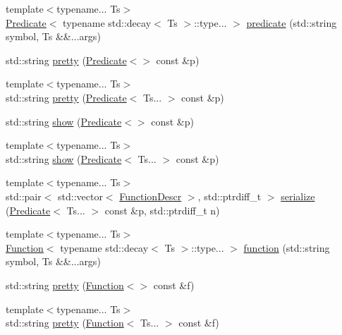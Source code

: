 \begin{DoxyCompactItemize}
\item 
{\footnotesize template$<$typename... Ts$>$ }\\\hyperlink{structpfq_1_1lang_1_1Predicate}{Predicate}$<$ typename std\+::decay$<$ Ts $>$\+::type... $>$ \hyperlink{namespacepfq_1_1lang_aca9adafc436b7f851621b979fa1aaf88}{predicate} (std\+::string symbol, Ts \&\&...args)
\item 
std\+::string \hyperlink{namespacepfq_1_1lang_a5bd21fba49ed1266540c831a9110fec6}{pretty} (\hyperlink{structpfq_1_1lang_1_1Predicate}{Predicate}$<$$>$ const \&p)
\item 
{\footnotesize template$<$typename... Ts$>$ }\\std\+::string \hyperlink{namespacepfq_1_1lang_a365497365bebd1ef44492e8027a6b3c0}{pretty} (\hyperlink{structpfq_1_1lang_1_1Predicate}{Predicate}$<$ Ts... $>$ const \&p)
\item 
std\+::string \hyperlink{namespacepfq_1_1lang_aeb7cd494cccb45ea7a0a400a51811646}{show} (\hyperlink{structpfq_1_1lang_1_1Predicate}{Predicate}$<$$>$ const \&p)
\item 
{\footnotesize template$<$typename... Ts$>$ }\\std\+::string \hyperlink{namespacepfq_1_1lang_a42c749f45910e4c14d412cc3db5791e5}{show} (\hyperlink{structpfq_1_1lang_1_1Predicate}{Predicate}$<$ Ts... $>$ const \&p)
\item 
{\footnotesize template$<$typename... Ts$>$ }\\std\+::pair$<$ std\+::vector$<$ \hyperlink{structpfq_1_1lang_1_1FunctionDescr}{Function\+Descr} $>$, std\+::ptrdiff\+\_\+t $>$ \hyperlink{namespacepfq_1_1lang_ad631d8e32cf8613ad1f3f19f1b02cab6}{serialize} (\hyperlink{structpfq_1_1lang_1_1Predicate}{Predicate}$<$ Ts... $>$ const \&p, std\+::ptrdiff\+\_\+t n)
\item 
{\footnotesize template$<$typename... Ts$>$ }\\\hyperlink{structpfq_1_1lang_1_1Function}{Function}$<$ typename std\+::decay$<$ Ts $>$\+::type... $>$ \hyperlink{namespacepfq_1_1lang_a1a4638059d700ae08d0ca63886ff2bb3}{function} (std\+::string symbol, Ts \&\&...args)
\item 
std\+::string \hyperlink{namespacepfq_1_1lang_a2e0ab6225ca9d5195bbebc1c5c58b5fc}{pretty} (\hyperlink{structpfq_1_1lang_1_1Function}{Function}$<$$>$ const \&f)
\item 
{\footnotesize template$<$typename... Ts$>$ }\\std\+::string \hyperlink{namespacepfq_1_1lang_ae99e641e0f2d5461ed2c09ce92a82156}{pretty} (\hyperlink{structpfq_1_1lang_1_1Function}{Function}$<$ Ts... $>$ const \&f)
$$
\end{DoxyCompactItemize}
